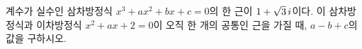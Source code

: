 계수가 실수인 삼차방정식 $x^3+ax^2+bx+c=0$의 한 근이 $1+\sqrt{3}\mkern3mu i$이다. 이 삼차방정식과 이차방정식 $x^2+ax+2=0$이 오직 한 개의 공통인 근을 가질 때, $a-b+c$의 값을 구하시오. 
